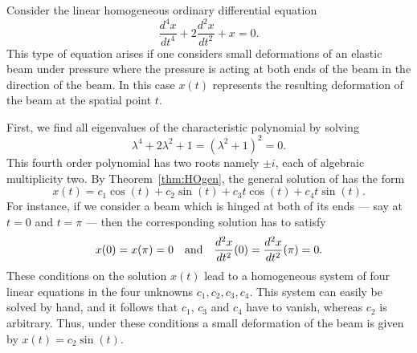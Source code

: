 Consider the linear homogeneous ordinary differential equation
\begin{equation}  \label{eq:soex3}
\frac{d^4x}{dt^4} + 2\frac{d^2x}{dt^2} + x= 0.
\end{equation}
This type of equation arises if one considers small deformations of
an elastic beam under pressure where the pressure is acting at both
ends of the beam in the direction of the beam.  In this case $x(t)$
represents the resulting deformation of the beam at the spatial point $t$.

First, we find all eigenvalues of the characteristic polynomial by solving
\[
\lambda^4 + 2\lambda^2 + 1 = (\lambda^2+1)^2 = 0.
\]
This fourth order polynomial has two roots namely $\pm i$, each of
algebraic multiplicity two.  By Theorem~\ref{thm:HOgen}, the general solution 
of  has the form
\[
x(t) = c_1 \cos(t)+ c_2 \sin(t) +c_3 t\cos(t)+ c_4 t\sin(t).
\]
For instance, if we consider a beam which is hinged at both of its ends ---
say at $t=0$ and $t=\pi$ --- then the corresponding solution has to satisfy
\[
x(0)=x(\pi)=0 \quad\mbox{and}\quad \frac{d^2x}{dt^2}(0)=\frac{d^2x}{dt^2}(\pi)=0.
\]
These conditions on the solution $x(t)$ lead to a homogeneous system of four
linear equations in the four unknowns $c_1,c_2,c_3,c_4$.  This system can
easily be solved by hand, and it follows that $c_1$, $c_3$ and $c_4$ have
to vanish, whereas $c_2$ is arbitrary.  Thus, under these conditions a
small deformation of the beam is given by $x(t)=c_2 \sin(t)$.

